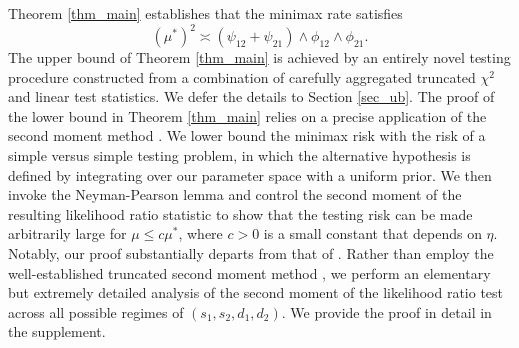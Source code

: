 \documentclass{article}
\theoremstyle{remark}
\begin{document}
Theorem \ref{thm_main} establishes that the minimax rate satisfies
\begin{equation}\label{eq_our_rate}
    (\mu^*)^2 \asymp \left( \psi_{12} + \psi_{21}\right) \land \phi_{12} \land \phi_{21}.
\end{equation}
The upper bound of Theorem \ref{thm_main} is achieved by an entirely novel testing procedure constructed from a combination of carefully aggregated truncated $\chi^2$ and linear test statistics. We defer the details to Section \ref{sec_ub}. The proof of the lower bound in Theorem \ref{thm_main} relies on a precise application of the second moment method \citep{ingster1982minimax}.  We lower bound the minimax risk with the risk of a simple versus simple testing problem, in which the alternative hypothesis is defined by integrating over our parameter space with a uniform prior. We then invoke the Neyman-Pearson lemma and control the second moment of the resulting likelihood ratio statistic to show that the testing risk can be made arbitrarily large for $\mu \leq c\mu^*$, where $c > 0$ is a small constant that depends on $\eta$.  Notably, our proof substantially departs from that of \citet{butucea2013detection}. Rather than employ the well-established truncated second moment method \citep{butucea2013detection, arias2014community, verzelen2015community}, we perform an elementary but extremely detailed analysis of the second moment of the likelihood ratio test across all possible regimes of $(s_1, s_2, d_1, d_2)$. We provide the proof in detail in the supplement.
\end{document}

